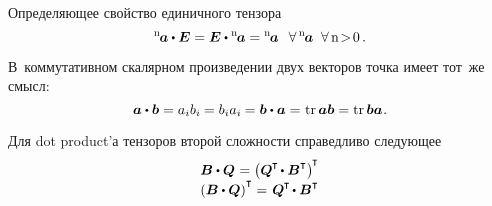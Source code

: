 \begin{otherlanguage}{russian}
Определяющее свойство единичного тензора
\vspace{0.16em}\begin{equation}\label{identifyofidentitytensor}
{^\mathrm{n}\hspace{-0.2ex}\bm{a}} \dotp \bm{E} = \bm{E} \dotp {^\mathrm{n}\hspace{-0.2ex}\bm{a}} = {^\mathrm{n}\hspace{-0.2ex}\bm{a}} \;\:\:
\forall \, {^\mathrm{n}\hspace{-0.2ex}\bm{a}} \;\; \forall \,\mathrm{n \!>\! 0}\,.
\end{equation}

В~коммутативном скалярном произведении двух векторов точка имеет тот~же смысл:
\begin{equation}
\bm{a} \dotp \bm{b} = a_i b_i \hspace{-0.1ex} = b_i a_i \hspace{-0.1ex} = \bm{b} \dotp \bm{a} = \hspace{0.1ex} \operatorname{tr} \bm{a}\bm{b} = \operatorname{tr} \bm{b}\bm{a} \hspace{0.1ex}.
\end{equation}

Для dot product’а тензоров второй сложности справедливо следующее
\vspace{-0.5em}\begin{equation}\label{transposeofdotproduct}
\begin{array}{c}
\bm{B} \dotp \bm{Q} \hspace{0.1ex} = \left({ \bm{Q}^{\hspace{-0.1ex}\T} \hspace{-0.2ex}\dotp \bm{B}^{\T} }\right)^{\hspace{-0.2ex}\T} \\[0.1em]
\left({ \bm{B} \dotp \bm{Q}}\right)^{\T} =\hspace{0.2ex} \bm{Q}^{\hspace{-0.1ex}\T} \hspace{-0.2ex}\dotp \bm{B}^{\T}
\end{array}
\end{equation}


\end{otherlanguage}

